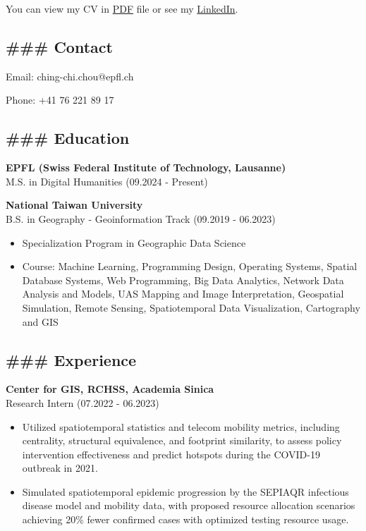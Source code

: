 You can view my CV in \href{cv.md}{PDF} file or see my
\href{http://www.linkedin.com/in/ching-chi-chou-31977b185}{LinkedIn}.

\subsection{\#\#\# Contact}\label{contact}

Email: ching-chi.chou@epfl.ch

Phone: +41 76 221 89 17

\subsection{\#\#\# Education}\label{education}

\textbf{EPFL (Swiss Federal Institute of Technology, Lausanne)}\\
M.S. in Digital Humanities (09.2024 - Present)

\textbf{National Taiwan University}\\
B.S. in Geography - Geoinformation Track (09.2019 - 06.2023)

\begin{itemize}
\item
  Specialization Program in Geographic Data Science
\item
  Course: Machine Learning, Programming Design, Operating Systems,
  Spatial Database Systems, Web Programming, Big Data Analytics, Network
  Data Analysis and Models, UAS Mapping and Image Interpretation,
  Geospatial Simulation, Remote Sensing, Spatiotemporal Data
  Visualization, Cartography and GIS
\end{itemize}

\subsection{\#\#\# Experience}\label{experience}

\textbf{Center for GIS, RCHSS, Academia Sinica}\\
Research Intern (07.2022 - 06.2023)

\begin{itemize}
\item
  Utilized spatiotemporal statistics and telecom mobility metrics,
  including centrality, structural equivalence, and footprint
  similarity, to assess policy intervention effectiveness and predict
  hotspots during the COVID-19 outbreak in 2021.
\item
  Simulated spatiotemporal epidemic progression by the SEPIAQR
  infectious disease model and mobility data, with proposed resource
  allocation scenarios achieving 20\% fewer confirmed cases with
  optimized testing resource usage.
\end{itemize}

